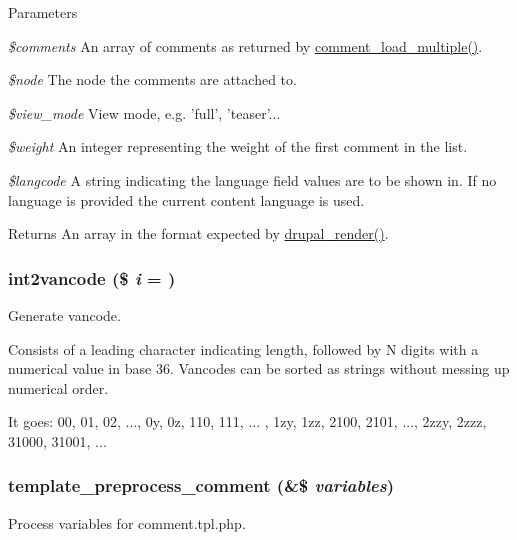 \begin{DoxyParams}{Parameters}
\item[{\em \$comments}]An array of comments as returned by \hyperlink{comment_8module_a0cfb98e73c618190693b683c9bbfc0b1}{comment\_\-load\_\-multiple()}. \item[{\em \$node}]The node the comments are attached to. \item[{\em \$view\_\-mode}]View mode, e.g. 'full', 'teaser'... \item[{\em \$weight}]An integer representing the weight of the first comment in the list. \item[{\em \$langcode}]A string indicating the language field values are to be shown in. If no language is provided the current content language is used.\end{DoxyParams}
\begin{DoxyReturn}{Returns}
An array in the format expected by \hyperlink{common_8inc_a05798b44e8d6c496d4bee5cc32fa7851}{drupal\_\-render()}. 
\end{DoxyReturn}
\hypertarget{comment_8module_a30537163d28e0425bc93b2fb1ec4aa54}{
\subsubsection[{int2vancode}]{\setlength{\rightskip}{0pt plus 5cm}int2vancode (\$ {\em i} = {})}}
\label{comment_8module_a30537163d28e0425bc93b2fb1ec4aa54}
Generate vancode.

Consists of a leading character indicating length, followed by N digits with a numerical value in base 36. Vancodes can be sorted as strings without messing up numerical order.

It goes: 00, 01, 02, ..., 0y, 0z, 110, 111, ... , 1zy, 1zz, 2100, 2101, ..., 2zzy, 2zzz, 31000, 31001, ... \hypertarget{comment_8module_a48adb63c53357fde9aea892ba131f3db}{
\subsubsection[{template\_\-preprocess\_\-comment}]{\setlength{\rightskip}{0pt plus 5cm}template\_\-preprocess\_\-comment (\&\$ {\em variables})}}
\label{comment_8module_a48adb63c53357fde9aea892ba131f3db}
Process variables for comment.tpl.php.

